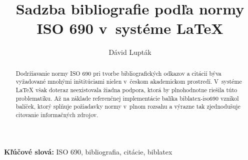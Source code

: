 \documentclass{csbulletin}
\begin{document}

\title{Sadzba bibliografie podľa normy ISO 690 v~systéme \LaTeX}
\author{Dávid Lupták}
\maketitle

\begin{abstract}
Dodržiavanie normy ISO 690 pri tvorbe bibliografických odkazov
a citácií býva vyžadované mnohými inštitúciami nielen v~českom
akademickom prostredí. V~systéme \LaTeX{} však doteraz neexistovala
žiadna podpora, ktorá by plnohodnotne riešila túto problematiku. Až
na základe referenčnej implementácie balíka \textsf{biblatex-iso690}
vznikol balíček, ktorý splňuje požiadavky normy v~plnom rozsahu
a výrazne tak zjednodušuje citovanie informačných zdrojov.
\end{abstract}

\medskip\par\textbf{Kľúčové slová:}
ISO 690, bibliografia, citácie, biblatex
\end{document}
